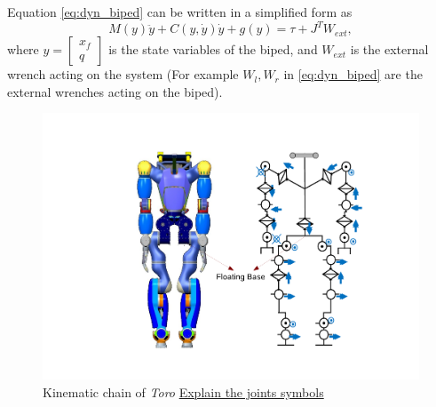 Equation \ref{eq:dyn_biped} can be written in a simplified form as
\begin{equation} \label{eq:dyn_sbiped}
M(y)\ddot{y} + C(y,\dot{y})\dot{y} + g(y) = \tau + J^T W_{ext},
\end{equation}
where $y = \begin{bmatrix} x_f \\ q \end{bmatrix}$ is the state variables of the biped, and $W_{ext}$ is the external wrench acting on the system (For example $W_l,W_r$ in \ref{eq:dyn_biped} are the external wrenches acting on the biped).
\begin{figure}
\begin{center}
\includegraphics[trim= 70mm 10mm 40mm 10mm,clip,scale=0.7]{Bilder/TORO_kinematic.pdf}
\caption{Kinematic chain of \emph{Toro} \underline{Explain the joints symbols}}
\label{fig:toro_kin}
\end{center}
\end{figure}
